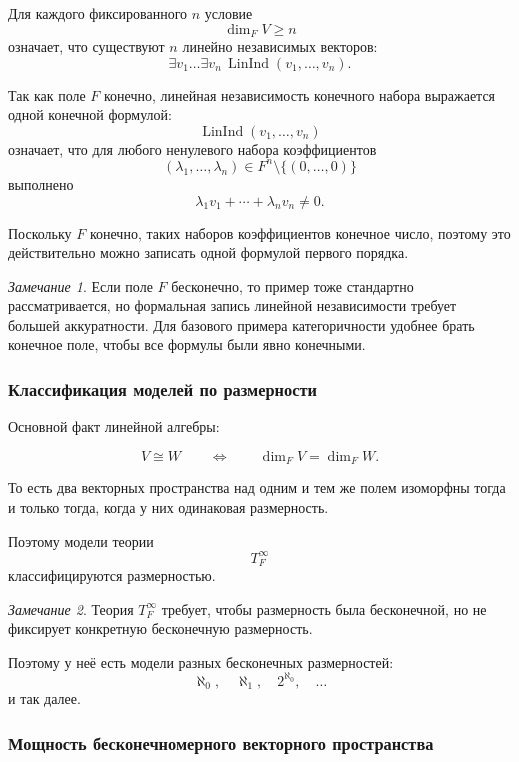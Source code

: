 \documentclass[12pt,a4paper,oneside,openany]{book}
\theoremstyle{definition}
\theoremstyle{plain}
\theoremstyle{remark}
\newtheorem{remark}{Замечание}[chapter]
\begin{document}
Для каждого фиксированного $n$ условие
\[
\dim_F V\ge n
\]
означает, что существуют $n$ линейно независимых векторов:
\[
\exists v_1\ldots\exists v_n\,
\operatorname{LinInd}(v_1,\ldots,v_n).
\]

Так как поле $F$ конечно, линейная независимость конечного набора выражается одной конечной формулой:
\[
\operatorname{LinInd}(v_1,\ldots,v_n)
\]
означает, что для любого ненулевого набора коэффициентов
\[
(\lambda_1,\ldots,\lambda_n)\in F^n\setminus\{(0,\ldots,0)\}
\]
выполнено
\[
\lambda_1v_1+\cdots+\lambda_nv_n\ne 0.
\]

Поскольку $F$ конечно, таких наборов коэффициентов конечное число, поэтому это действительно можно записать одной формулой первого порядка.

\begin{remark}
Если поле $F$ бесконечно, то пример тоже стандартно рассматривается, но формальная запись линейной независимости требует большей аккуратности. Для базового примера категоричности удобнее брать конечное поле, чтобы все формулы были явно конечными.
\end{remark}

\subsubsection{Классификация моделей по размерности}

Основной факт линейной алгебры:

\[
V\cong W
\qquad
\Longleftrightarrow
\qquad
\dim_F V=\dim_F W.
\]

То есть два векторных пространства над одним и тем же полем изоморфны тогда и только тогда, когда у них одинаковая размерность.

Поэтому модели теории
\[
T_F^\infty
\]
классифицируются размерностью.

\begin{remark}
Теория $T_F^\infty$ требует, чтобы размерность была бесконечной, но не фиксирует конкретную бесконечную размерность.

Поэтому у неё есть модели разных бесконечных размерностей:
\[
\aleph_0,\quad \aleph_1,\quad 2^{\aleph_0},\quad \ldots
\]
и так далее.
\end{remark}

\subsubsection{Мощность бесконечномерного векторного пространства}
\end{document}
